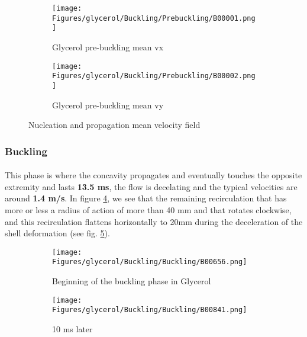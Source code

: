 \documentclass[a4paper,10pt]{report}
\begin{document}
\begin{figure}[htbp]%
	\centering%
	 \begin{subfigure}[h]{0.5\textwidth}%
        \texttt{[image: Figures/glycerol/Buckling/Prebuckling/B00001.png]}%
        \caption{Glycerol pre-buckling mean vx}%
				\label{fig:Gprebucklingmeanvx}%
    \end{subfigure}%
    \begin{subfigure}[h]{0.5\linewidth}%
        \texttt{[image: Figures/glycerol/Buckling/Prebuckling/B00002.png]}%
        \caption{Glycerol pre-buckling mean vy}%
        \label{fig:Gprebucklingmeanvy}%
    \end{subfigure}%
		\caption{Nucleation and propagation mean velocity field}%
		\label{fig:GPrebucklingmeanvelocityfield}%
\end{figure}
\subsubsection{Buckling}
\paragraph{}
This phase is where the concavity propagates and eventually touches the opposite extremity and lasts \textbf{13.5 ms}, the flow is decelating and the typical velocities are around \textbf{1.4 m/s}.
In figure \ref{fig:bigVortex}, we see that the remaining recirculation that has more or less a radius of action of more than 40 mm and that rotates clockwise, and this recirculation flattens horizontally to 20mm during the deceleration of the shell deformation (see fig. \ref{fig:flattenVortex}).

\begin{figure}[htbp]%
	\centering%
	 \begin{subfigure}[h]{0.5\textwidth}%
        \texttt{[image: Figures/glycerol/Buckling/Buckling/B00656.png]}%
        \caption{Beginning of the buckling phase in Glycerol}%
				\label{fig:bigVortex}%
    \end{subfigure}%
    \begin{subfigure}[h]{0.5\linewidth}%
        \texttt{[image: Figures/glycerol/Buckling/Buckling/B00841.png]}%
        \caption{10 ms later}%
        \label{fig:flattenVortex}%
    \end{subfigure}%
		\caption{}%
		\label{fig:GPrebucklingmeanvelocityfield}%
\end{figure}
\end{document}
